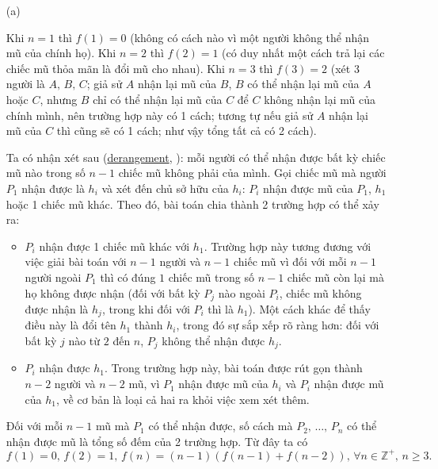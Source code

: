 \begin{enumerate}
    \item[(a)] {
        Khi $n = 1$ thì $f(1) = 0$ (không có cách nào vì một người không thể nhận mũ của chính họ). Khi $n = 2$ thì $f(2) = 1$ (có duy nhất một cách trả lại các chiếc mũ thỏa mãn là đổi mũ cho nhau). Khi $n = 3$ thì $f(3) = 2$ (xét 3 người là $A,\,B,\,C$; giả sử $A$ nhận lại mũ của $B$, $B$ có thể nhận lại mũ của $A$ hoặc $C$, nhưng $B$ chỉ có thể nhận lại mũ của $C$ để $C$ không nhận lại mũ của chính mình, nên trường hợp này có 1 cách; tương tự nếu giả sử $A$ nhận lại mũ của $C$ thì cũng sẽ có 1 cách; như vậy tổng tất cả có 2 cách).

        Ta có nhận xét sau (\href{https://en.wikipedia.org/wiki/Derangement}{derangement}, \parencite{nqbh-combinatorics}): mỗi người có thể nhận được bất kỳ chiếc mũ nào trong số $n - 1$ chiếc mũ không phải của mình. Gọi chiếc mũ mà người $P_1$ nhận được là $h_i$ và xét đến chủ sở hữu của $h_i$: $P_i$ nhận được mũ của $P_1$, $h_1$ hoặc 1 chiếc mũ khác. Theo đó, bài toán chia thành 2 trường hợp có thể xảy ra:
        \begin{itemize}
            \item $P_i$ nhận được 1 chiếc mũ khác với $h_1$. Trường hợp này tương đương với việc giải bài toán với $n - 1$ người và $n - 1$ chiếc mũ vì đối với mỗi $n - 1$ người ngoài $P_1$ thì có đúng $1$ chiếc mũ trong số $n - 1$ chiếc mũ còn lại mà họ không được nhận (đối với bất kỳ $P_j$ nào ngoài $P_i$, chiếc mũ không được nhận là $h_j$, trong khi đối với $P_i$ thì là $h_1$). Một cách khác để thấy điều này là đổi tên $h_1$ thành $h_i$, trong đó sự sắp xếp rõ ràng hơn: đối với bất kỳ $j$ nào từ $2$ đến $n$, $P_j$ không thể nhận được $h_j$.
            \item $P_i$ nhận được $h_1$. Trong trường hợp này, bài toán được rút gọn thành $n - 2$ người và $n - 2$ mũ, vì $P_1$ nhận được mũ của $h_i$ và $P_i$ nhận được mũ của $h_1$, về cơ bản là loại cả hai ra khỏi việc xem xét thêm.
        \end{itemize}

        Đối với mỗi $n - 1$ mũ mà $P_1$ có thể nhận được, số cách mà $P_2,\,\ldots,\,P_n$ có thể nhận được mũ là tổng số đếm của 2 trường hợp. Từ đây ta có
        \begin{equation*}
            f(1) = 0,\,f(2) = 1,\,f(n) = (n - 1)(f(n - 1) + f(n - 2)),\,\forall n\in\mathbb{Z^+},\,n\geq 3.
        \end{equation*}         

}
\end{enumerate}
